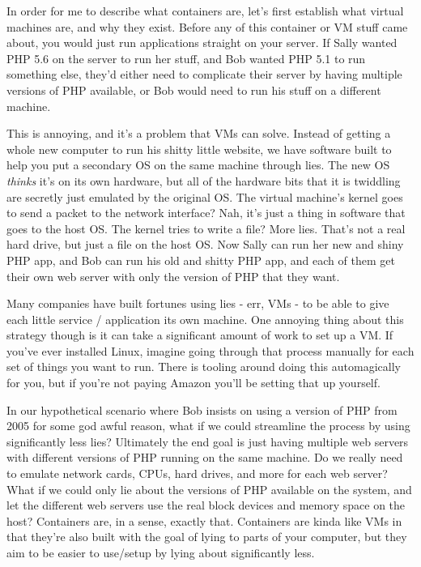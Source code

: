 \documentclass[9pt]{extarticle} %
\begin{document}
\begin{minipage}[t]{.66\linewidth}
In order for me to describe what containers are, let's first establish what
virtual machines are, and why they exist. Before any of this container or VM
stuff came about, you would just run applications straight on your server. 
If Sally wanted PHP 5.6 on the server to run her stuff, and Bob wanted PHP 5.1
to run something else, they'd either need to complicate their server by having multiple versions of PHP available, or Bob would need to run his stuff on a different machine.

This is annoying, and it's a problem that VMs can solve. Instead of getting a
whole new computer to run his shitty little website, we have software built to
help you put a secondary OS on the same machine through lies. The new OS
\textit{thinks} it's on its own hardware, but all of the hardware bits that
it is twiddling are secretly just emulated by the original OS. The virtual
machine's kernel goes to send a packet to the network interface? Nah, it's 
just a thing in software that goes to the host OS. The kernel tries to write a
file? More lies. That's not a real hard drive, but just a file on the host OS. 
Now Sally can run her new and shiny PHP app, and Bob can run his old and shitty
PHP app, and each of them get their own web server with only the version of PHP
that they want.

Many companies have built fortunes using lies - err, VMs - to be able to give
each little service / application its own machine. One annoying thing about
this strategy though is it can take a significant amount of work to set up a
VM. If you've ever installed Linux, imagine going through that process manually
for each set of things you want to run. There is tooling around doing this
automagically for you, but if you're not paying Amazon you'll be setting that
up yourself.

In our hypothetical scenario where Bob insists on using a version of PHP from
2005 for some god awful reason, what if we could streamline the process by
using significantly less lies? Ultimately the end goal is just having multiple
web servers with different versions of PHP running on the same machine. Do we
really need to emulate network cards, CPUs, hard drives, and more for each web
server? What if we could only lie about the versions of PHP available on the
system, and let the different web servers use the real block devices and memory
space on the host? Containers are, in a sense, exactly that. Containers are kinda
like VMs in that they're also built with the goal of lying to parts of your computer,
but they aim to be easier to use/setup by lying about significantly less.


\end{minipage} %
\end{document}
